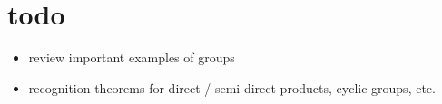 \section*{todo}
\begin{itemize}
	\item review important examples of groups
	\item recognition theorems for direct / semi-direct products, cyclic groups, etc.
\end{itemize}